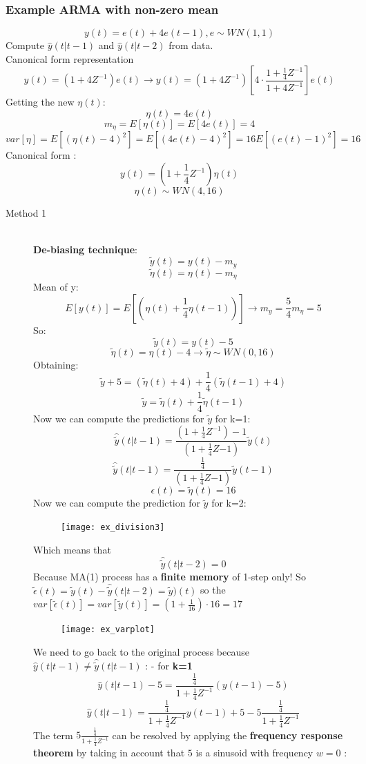 \subsubsection{Example ARMA with non-zero mean}
$$ y(t) =e(t) + 4e(t-1) , e \sim WN(1,1)$$
Compute $\hat{y}(t|t-1)$ and $\hat{y}(t|t-2)$ from data.\\
Canonical form representation\\
$$y(t) =(1+4Z^{-1})e(t) \to y(t)= (1+4Z^{-1})[4\cdot \frac{1+\frac{1}{4}Z^{-1}}{1+4Z^{-1}}]e(t)$$
Getting the new $\eta(t)$:
$$ \eta(t) = 4e(t)$$
$$m_{\eta}=E[\eta(t)]=E[4e(t)] = 4$$
$$var[\eta]= E[(\eta(t)-4)^2]= E[(4e(t)-4)^2]= 16E[(e(t)-1)^2] =16$$
Canonical form :
\[
\boxed{y(t) =(1+\frac{1}{4}Z^{-1})\eta(t)}
\]
\[
\boxed{\eta(t) \sim WN(4,16)}
\]
\begin{description}
\item[Method 1]\hfill\\
\textbf{De-biasing technique}:
$$ \tilde{y}(t) = y(t) - m_y$$
$$ \tilde{\eta}(t) = \eta(t) - m_{\eta}$$
Mean of y:
$$ E[y(t)]=E[(\eta(t)+\frac{1}{4}\eta(t-1))] \to m_y= \frac{5}{4}m_{\eta}=5$$
So:
$$ \tilde{y}(t) = y(t) - 5$$
$$ \tilde{\eta}(t) = \eta(t) - 4 \to \tilde{\eta} \sim WN(0,16)$$
Obtaining:
$$ \tilde{y}+5= (\tilde{\eta}(t)+4)+\frac{1}{4}(\tilde{\eta}(t-1)+4)$$
\[
\boxed{\tilde{y}= \tilde{\eta}(t)+\frac{1}{4}\tilde{\eta}(t-1)}
\]
Now we can compute the predictions for $\tilde{y}$ for k=1:
 $$ \hat{\tilde{y}}(t|t-1)= \frac{(1+\frac{1}{4}Z^{-1})-1}{(1+\frac{1}{4}Z{-1})} \tilde{y}(t)$$
\[
\boxed{\hat{\tilde{y}}(t|t-1)= \frac{\frac{1}{4}}{(1+\frac{1}{4}Z{-1})} \tilde{y}(t-1)}
\]
\[
\boxed{\epsilon(t) = \tilde{\eta}(t) = 16}
\]
Now we can compute the prediction for $\tilde{y}$ for k=2:
\begin{figure}[H]
 \centering
  \texttt{[image: ex\_division3]}
\end{figure}
Which means that 
\[
\boxed{\hat{\tilde{y}}(t|t-2) = 0}
\]
Because MA(1) process has a \textbf{finite memory} of 1-step only!
So $\tilde{\epsilon}(t) = \tilde{y}(t) - \hat{\tilde{y}}(t|t-2) = \tilde{y})(t)$ so the $var[\tilde{\epsilon}(t)]=var[\tilde{y}(t)] = (1+\frac{1}{16}) \cdot 16= 17$
\begin{figure}[H]
 \centering
  \texttt{[image: ex\_varplot]}
\end{figure}
We need to go back to the original process because $\hat{y}(t|t-1) \neq \hat{\tilde{y}}(t|t-1)$ : 
- for \textbf{k=1}\\
$$ \hat{y}(t|t-1)-5 = \frac{\frac{1}{4}}{1+\frac{1}{4}Z^{-1}}(y(t-1)-5)$$
$$ \hat{y}(t|t-1)= \frac{\frac{1}{4}}{1+\frac{1}{4}Z^{-1}}y(t-1)+5 - 5\frac{\frac{1}{4}}{1+\frac{1}{4}Z^{-1}}$$
The term  $5\frac{\frac{1}{4}}{1+\frac{1}{4}Z^{-1}}$ can be resolved by applying the \textbf{frequency response theorem } by taking in account that $5$ is a sinusoid with frequency $w=0$ : 


\end{description}
